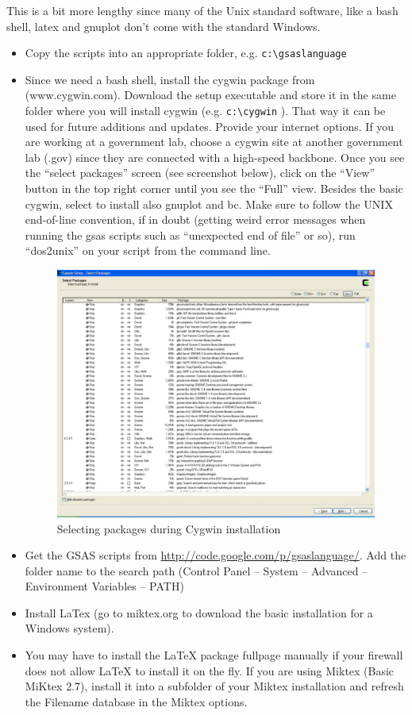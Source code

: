 This is a bit more lengthy since many of the Unix standard software, like a bash shell, latex and gnuplot don't come with the standard Windows.
\begin{itemize}
\item Copy the scripts into an appropriate folder, e.g. \texttt{c:\textbackslash gsaslanguage} 
\item Since we need a bash shell, install the cygwin package from (www.cygwin.com).  Download the setup executable and store it in the same folder where you will install cygwin (e.g. \texttt{c:\textbackslash cygwin} ). That way it can be used for future additions and updates. Provide your internet options. If you are working at a government lab, choose a cygwin site at another government lab (.gov) since they are connected with a high-speed backbone. Once you see the ``select packages'' screen (see screenshot below), click on the ``View'' button in the top right corner until you see the ``Full'' view. Besides the basic cygwin, select to install also gnuplot and bc.  Make sure to follow the UNIX end-of-line convention, if in doubt (getting weird error messages when running the gsas scripts such as ``unexpected end of file'' or so), run ``dos2unix'' on your script from the command line.
\begin{figure}[h]
\centering
\includegraphics[width=12cm]{Screenshot1.pdf}
\caption{Selecting packages during Cygwin installation}
\label{fig:Screenshot1}
\end{figure}

\item Get the GSAS scripts from \url{http://code.google.com/p/gsaslanguage/}. Add the folder name to the search path (Control Panel -- System -- Advanced
-- Environment Variables -- PATH)
\item Install LaTex (go to miktex.org to download the basic installation for a Windows system).
\item You may have to install the LaTeX package fullpage manually if your firewall does not allow LaTeX to install it on the fly. If you are using Miktex (Basic MiKtex 2.7), install it into a subfolder of your Miktex installation and refresh the Filename database in the Miktex options.
\end{itemize}

